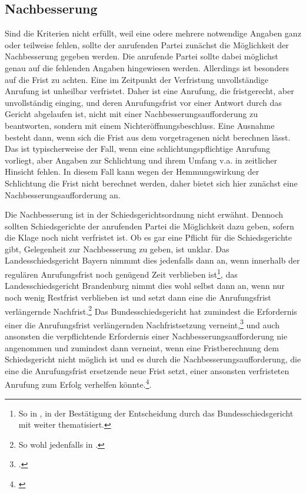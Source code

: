 \subsection{Nachbesserung}
\label{Standardworkflow:Beschluss:Nachbesserung}
Sind die Kriterien nicht erfüllt, weil eine odere mehrere notwendige Angaben ganz oder teilweise fehlen, sollte der anrufenden Partei zunächst die Möglichkeit der Nachbesserung gegeben werden.
Die anrufende Partei sollte dabei möglichst genau auf die fehlenden Angaben hingewiesen werden.
Allerdings ist besonders auf die Frist zu achten.
Eine im Zeitpunkt der Verfristung unvollständige Anrufung ist unheilbar verfristet.
Daher ist eine Anrufung, die fristgerecht, aber unvollständig einging, und deren Anrufungsfrist vor einer Antwort durch das Gericht abgelaufen ist, nicht mit einer Nachbesserungsaufforderung zu beantworten, sondern mit einem Nichteröffnungsbeschluss.
Eine Ausnahme besteht dann, wenn sich die Frist aus dem vorgetragenen nicht berechnen lässt.
Das ist typischerweise der Fall, wenn eine schlichtungspflichtige Anrufung vorliegt, aber Angaben zur Schlichtung und ihrem Umfang v.a. in zeitlicher Hinsicht fehlen.
In diesem Fall kann wegen der Hemmungswirkung der Schlichtung die Frist nicht berechnet werden, daher bietet sich hier zunächst eine Nachbesserungsaufforderung an.

Die Nachbesserung ist in der Schiedsgerichtsordnung nicht erwähnt.
Dennoch sollten Schiedsgerichte der anrufenden Partei die Möglichkeit dazu geben, sofern die Klage noch nicht verfristet ist.
Ob es gar eine Pflicht für die Schiedsgerichte gibt, Gelegenheit zur Nachbesserung zu geben, ist unklar.
Das Landesschiedsgericht Bayern nimmmt dies jedenfalls dann an, wenn innerhalb der regulären Anrufungsfrist noch genügend Zeit verblieben ist\footnote{So in \cite[S.~2~f.]{LSGBYB413U}, in der Bestätigung der Entscheidung durch das Bundesschiedsgericht mit \cite{BSG314HA} weiter thematisiert.}, das Landesschiedsgericht Brandenburg nimmt dies wohl selbst dann an, wenn nur noch wenig Restfrist verblieben ist und setzt dann eine die Anrufungsfrist verlängernde Nachfrist.\footnote{So wohl jedenfalls in \cites[S.~7]{LSGBB133}{LSGBB134}.}
Das Bundesschiedsgericht hat zumindest die Erfordernis einer die Anrufungsfrist verlängernden Nachfristsetzung verneint,\footnote{\cites[S.~2]{BSG2315HS}[S.~2]{BSG20130227}.} und auch ansonsten die verpflichtende Erfordernis einer Nachbesserungsaufforderung  nie angenommen und zumindest dann verneint, wenn eine Fristberechnung dem Schiedsgericht nicht möglich ist und es durch die Nachbesserungsaufforderung, die eine die Anrufungsfrist ersetzende neue Frist setzt, einer ansonsten verfristeten Anrufung zum Erfolg verhelfen könnte.\footnote{\cites{BSG3915HS}[S.~2]{BSG215HS}}.


